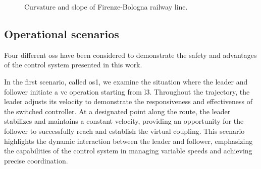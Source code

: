 \documentclass[letterpaper, 10 pt, conference]{ieeeconf}
\theoremstyle{definition}
\theoremstyle{nopoint}
\newcommand{\red}[1]{%
	{\color{red}{#1}}%
}
\newcommand{\blue}[1]{%
	{\color{blue}{#1}}%
}
\begin{document}
  	\begin{figure}[h]
  			\caption{Curvature and slope of Firenze-Bologna railway line.}
  			 \label{fig:trackProfile}	
  		\end{figure}
  		
  		
  
  




 \subsection{Operational scenarios}
  \label{sec:OperationalScenarios}
  
  Four different \glspl{os} have been considered to demonstrate the safety and advantages of the control system presented in this work. 
  
  In the first scenario, called \gls{os}1, we examine the situation where the leader and follower initiate a \gls{vc} operation starting from \gls{l3}. Throughout the trajectory, the leader adjusts its velocity to demonstrate the responsiveness and effectiveness of the switched controller. At a designated point along the route, the leader stabilizes and maintains a constant velocity, providing an opportunity for the follower to successfully reach and establish the virtual coupling. This scenario highlights the dynamic interaction between the leader and follower, emphasizing the capabilities of the control system in managing variable speeds and achieving precise coordination.
  
\end{document}
